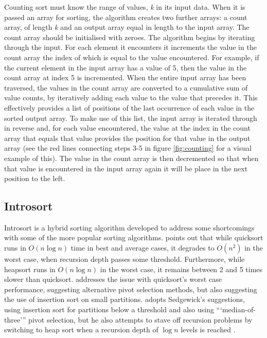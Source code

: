 \documentclass[12pt, a4paper]{article}
\begin{document}
Counting sort must know the range of values, \emph{k} in its input data. When it is passed an array for sorting, the algorithm creates two further arrays: a count array, of length \emph{k} and an output array equal in length to the input array. The count array should be initialised with zeroes. The algorithm begins by iterating through the input. For each element it encounters it increments the value in the count array the index of which is equal to the value encountered. For example, if the current element in the input array has a value of 5, then the value in the count array at index 5 is incremented. When the entire input array has been traversed, the values in the count array are converted to a cumulative sum of value counts, by iteratively adding each value to the value that precedes it. This effectively provides a list of positions of the last occurrence of each value in the sorted output array. To make use of this list, the input array is iterated through in reverse and, for each value encountered, the value at the index in the count array that equals that value provides the position for that value in the output array (see the red lines connecting steps 3-5 in figure \ref{fig:counting} for a visual example of this). The value in the count array is then decremented so that when that value is encountered in the input array again it will be place in the next position to the left.


\subsection{Introsort}\label{sec:introsort}

Introsort is a hybrid sorting algorithm developed to address some shortcomings with some of the more popular sorting algorithms. \textcite[983]{musser1997} points out that while quicksort runs in $O(n\log n)$ time in best and average cases, it degrades to $O(n^{2})$ in the worst case, when recursion depth passes some threshold. Furthermore, while heapsort runs in $O(n\log n)$ in the worst case, it remains between 2 and 5 times slower than quicksort. \textcite{Sedgewick-1978} addresses the issue with quicksort's worst case performance, suggesting alternative pivot selection methods, but also suggesting the use of insertion sort on small partitions. \textcite[986]{musser1997} adopts Sedgewick's suggestions, using insertion sort for partitions below a threshold and also using ```median-of-three''' pivot selection, but he also attempts to stave off recursion problems by switching to heap sort when a recursion depth of $\log n$ levels is reached \autocite{heineman2016algorithms}.
\end{document}
